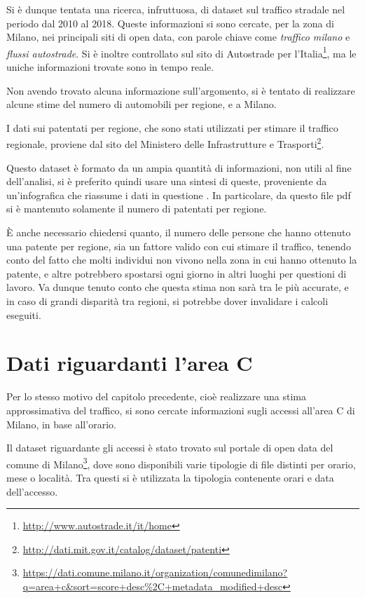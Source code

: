 \documentclass[a4paper,12pt]{report}
\newcommand{\quotestyle}[1]{\textit{#1}}
\begin{document}
Si è dunque tentata una ricerca, infruttuosa, di dataset sul traffico stradale nel periodo 
dal 2010 al 2018. 
Queste informazioni si sono cercate, per la zona di Milano, nei principali 
siti di open data, con parole chiave come \quotestyle{traffico milano} e 
\quotestyle{flussi autostrade}. 
Si è inoltre controllato sul sito di Autostrade per 
l'Italia\footnote{\url{http://www.autostrade.it/it/home}}, 
ma le uniche informazioni trovate sono in tempo reale. 

Non avendo trovato alcuna informazione sull'argomento, si è tentato di realizzare 
alcune stime del numero di automobili per regione, e a Milano. 

I dati sui patentati per regione, che sono stati utilizzati per stimare il traffico 
regionale, proviene dal sito del Ministero delle Infrastrutture e 
Trasporti\footnote{\url{http://dati.mit.gov.it/catalog/dataset/patenti}}. 

Questo dataset è formato da un ampia quantità di informazioni, 
non utili al fine dell'analisi, 
si è preferito quindi usare una sintesi di queste, proveniente da 
un'infografica che riassume i dati in questione \cite{INFOGRAFICA_MIT:1}. 
In particolare, da questo file pdf si è mantenuto solamente 
il numero di patentati per regione. 

\`E anche necessario chiedersi quanto, il numero delle persone che hanno ottenuto 
una patente per regione, sia un fattore valido con cui stimare il traffico, 
tenendo conto del fatto che molti individui non vivono nella zona 
in cui hanno ottenuto la patente, e altre potrebbero spostarsi ogni giorno in altri 
luoghi per questioni di lavoro. 
Va dunque tenuto conto che questa stima non sarà tra le più accurate, 
e in caso di grandi disparità tra regioni, si potrebbe dover invalidare 
i calcoli eseguiti. 

\section{Dati riguardanti l'area C}

Per lo stesso motivo del capitolo precedente, cioè realizzare una stima approssimativa 
del traffico, si sono cercate informazioni sugli accessi all'area C di Milano, 
in base all'orario. 

Il dataset riguardante gli accessi è stato trovato sul portale di open data 
del comune di 
Milano\footnote{\url{https://dati.comune.milano.it/organization/comunedimilano?q=area+c&sort=score+desc\%2C+metadata_modified+desc}}, 
dove sono disponibili varie tipologie di file distinti per orario, 
mese o località. 
Tra questi si è utilizzata la tipologia contenente orari e data dell'accesso. 
\end{document}
